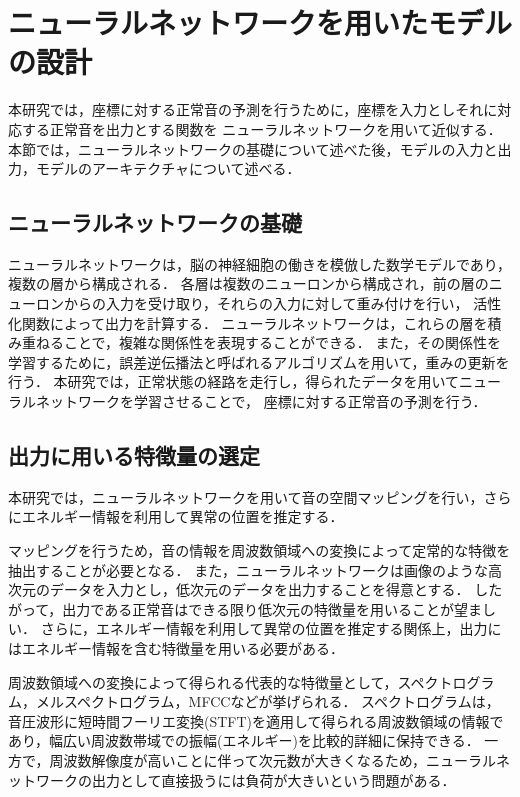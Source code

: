 \documentclass[../main]{subfiles}
\begin{document}
\section{ニューラルネットワークを用いたモデルの設計}
\label{sec:pmethod_neural_network}

本研究では，座標に対する正常音の予測を行うために，座標を入力としそれに対応する正常音を出力とする関数を
ニューラルネットワークを用いて近似する．
本節では，ニューラルネットワークの基礎について述べた後，モデルの入力と出力，モデルのアーキテクチャについて述べる．
\subsection{ニューラルネットワークの基礎}
ニューラルネットワークは，脳の神経細胞の働きを模倣した数学モデルであり，複数の層から構成される．
各層は複数のニューロンから構成され，前の層のニューロンからの入力を受け取り，それらの入力に対して重み付けを行い，
活性化関数によって出力を計算する．
ニューラルネットワークは，これらの層を積み重ねることで，複雑な関係性を表現することができる．
また，その関係性を学習するために，誤差逆伝播法と呼ばれるアルゴリズムを用いて，重みの更新を行う．
本研究では，正常状態の経路を走行し，得られたデータを用いてニューラルネットワークを学習させることで，
座標に対する正常音の予測を行う．

\subsection{出力に用いる特徴量の選定}
\label{sec:pmethod_feature_selection}

本研究では，ニューラルネットワークを用いて音の空間マッピングを行い，さらにエネルギー情報を利用して異常の位置を推定する．

マッピングを行うため，音の情報を周波数領域への変換によって定常的な特徴を抽出することが必要となる． また，ニューラルネットワークは画像のような高次元のデータを入力とし，低次元のデータを出力することを得意とする． したがって，出力である正常音はできる限り低次元の特徴量を用いることが望ましい． さらに，エネルギー情報を利用して異常の位置を推定する関係上，出力にはエネルギー情報を含む特徴量を用いる必要がある．

周波数領域への変換によって得られる代表的な特徴量として，スペクトログラム，メルスペクトログラム，MFCCなどが挙げられる． スペクトログラムは，音圧波形に短時間フーリエ変換(STFT)を適用して得られる周波数領域の情報であり，幅広い周波数帯域での振幅(エネルギー)を比較的詳細に保持できる． 一方で，周波数解像度が高いことに伴って次元数が大きくなるため，ニューラルネットワークの出力として直接扱うには負荷が大きいという問題がある．
\end{document}

